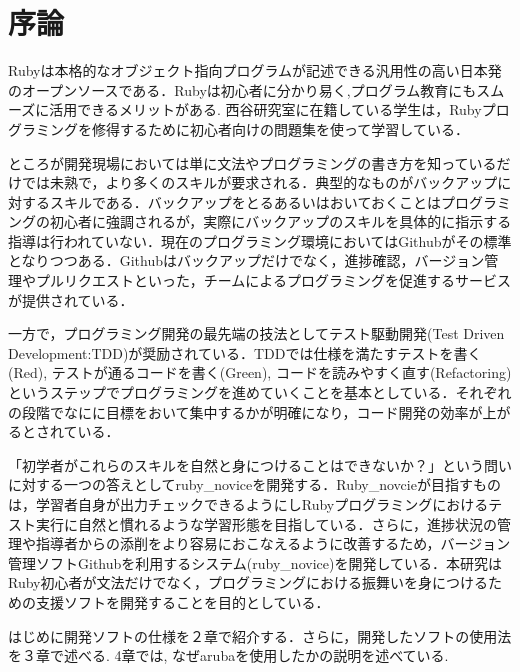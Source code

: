 \section{序論}
Rubyは本格的なオブジェクト指向プログラムが記述できる汎用性の高い日本発のオープンソースである．Rubyは初心者に分かり易く,プログラム教育にもスムーズに活用できるメリットがある\cite{1}. 西谷研究室に在籍している学生は，Rubyプログラミングを修得するために初心者向けの問題集を使って学習している．

ところが開発現場においては単に文法やプログラミングの書き方を知っているだけでは未熟で，より多くのスキルが要求される．典型的なものがバックアップに対するスキルである．バックアップをとるあるいはおいておくことはプログラミングの初心者に強調されるが，実際にバックアップのスキルを具体的に指示する指導は行われていない．現在のプログラミング環境においてはGithubがその標準となりつつある．Githubはバックアップだけでなく，進捗確認，バージョン管理やプルリクエストといった，チームによるプログラミングを促進するサービスが提供されている．

一方で，プログラミング開発の最先端の技法としてテスト駆動開発(Test Driven Development:TDD)が奨励されている．TDDでは仕様を満たすテストを書く(Red), テストが通るコードを書く(Green), コードを読みやすく直す(Refactoring)というステップでプログラミングを進めていくことを基本としている．それぞれの段階でなにに目標をおいて集中するかが明確になり，コード開発の効率が上がるとされている．

「初学者がこれらのスキルを自然と身につけることはできないか？」という問いに対する一つの答えとしてruby\_noviceを開発する．Ruby\_novcieが目指すものは，学習者自身が出力チェックできるようにしRubyプログラミングにおけるテスト実行に自然と慣れるような学習形態を目指している．さらに，進捗状況の管理や指導者からの添削をより容易におこなえるように改善するため，バージョン管理ソフトGithubを利用するシステム(ruby\_novice)を開発している．本研究はRuby初心者が文法だけでなく，プログラミングにおける振舞いを身につけるための支援ソフトを開発することを目的としている．

はじめに開発ソフトの仕様を２章で紹介する．さらに，開発したソフトの使用法を３章で述べる. 4章では, なぜarubaを使用したかの説明を述べている.

